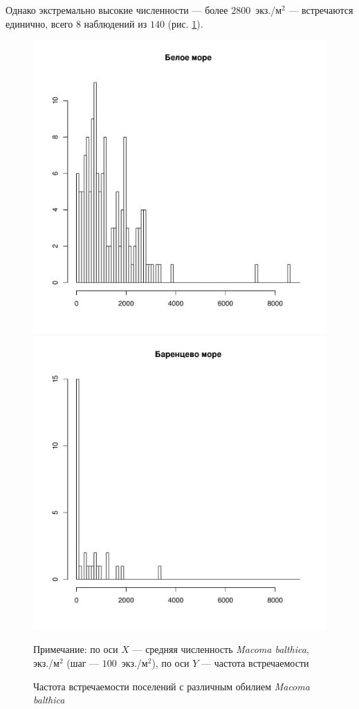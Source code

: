 %
Однако экстремально высокие численности --- более $2800$~экз./м$^2$ --- встречаются единично, всего $8$ наблюдений из $140$ (рис. \ref{ris:Nmean_hist}).
%
	\begin{figure}[ht]
		\includegraphics[height=.3\textheight]{../All_N/Nmean_hist_White1.pdf}
		\includegraphics[height=.3\textheight]{../All_N/Nmean_hist_Barents1.pdf}
	\caption{Частота встречаемости поселений с различным обилием {\it Macoma balthica}}
	{\footnotesize Примечание: по оси $X$ --- средняя численность {\it Macoma balthica}, экз./м$^2$ (шаг --- $100$~экз./м$^2$), по оси $Y$ 	--- частота встречаемости}
	\label{ris:Nmean_hist}
	\end{figure}

